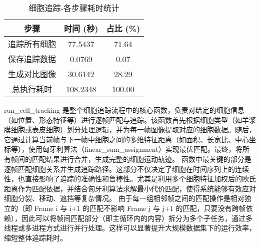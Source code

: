 \begin{table}[!htbp]
    \centering
    \caption{细胞追踪-各步骤耗时统计}
    \begin{tabular*}{300pt}{@{\extracolsep{\fill}}ccc}
        \toprule
        步骤               & 时间 (秒)  & 占比 (\%) \\
        \midrule
        追踪所有细胞       & 77.5437    & 71.64     \\
        保存追踪数据       & 0.0769     & 0.07      \\
        生成对比图像       & 30.6142    & 28.29     \\
        总执行耗时         & 108.2348   & 100.00    \\
        \bottomrule
    \end{tabular*}
\end{table}
run\_cell\_tracking 是整个细胞追踪流程中的核心函数，负责对给定的细胞信息（如位置、形态特征等）进行逐帧匹配与追踪。该函数首先根据细胞类型（如羊浆膜细胞或表皮细胞）划分处理逻辑，并为每一帧图像提取对应的细胞数据。随后，它通过计算当前帧与下一帧中细胞之间的多维特征距离（如面积、长宽比、中心坐标等），使用匈牙利算法（linear\_sum\_assignment）实现最优匹配。最终，将所有帧间的匹配结果进行合并，生成完整的细胞运动轨迹。
函数中最关键的部分是逐帧匹配细胞关系并生成追踪路径。这部分不仅决定了细胞在时间序列上的连续性，也直接影响了追踪的准确性和鲁棒性。尤其是利用多个细胞特征加权后的欧氏距离作为匹配依据，并结合匈牙利算法求解最小代价匹配，使得系统能够有效应对细胞分裂、移动、遮挡等复杂情况。
由于每一组相邻帧之间的匹配操作是相对独立的（即 Frame i 与 i+1 的匹配不影响 Frame j 与 j+1 的匹配，只要没有跨帧依赖），因此可以将帧间匹配部分（即主循环内的内容）拆分为多个子任务，通过多线程或多进程方式进行并行处理。这样可以显著提升大规模数据集下的运行效率，缩短整体追踪耗时。
